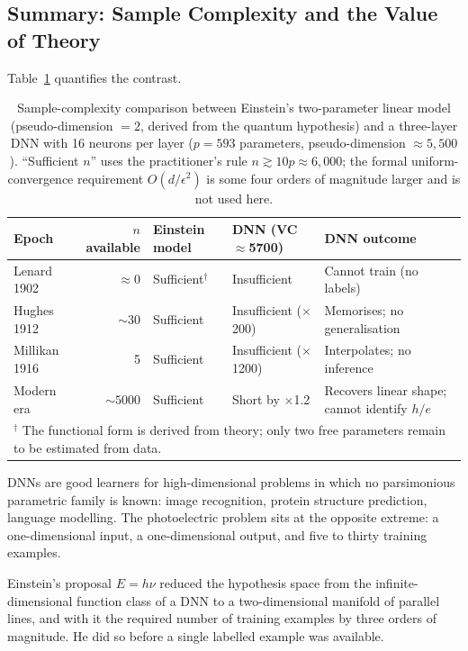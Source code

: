 \documentclass[12pt]{article}
\begin{document}
\subsection{Summary: Sample Complexity and the Value of Theory}

Table~\ref{tab:sample_complexity} quantifies the contrast.

\begin{table}[ht]
\centering
\caption{Sample-complexity comparison between Einstein's two-parameter
linear model (pseudo-dimension $=2$, derived from the quantum hypothesis) and
a three-layer DNN with 16 neurons per layer ($p=593$ parameters,
pseudo-dimension $\approx 5{,}500$).  ``Sufficient $n$'' uses the
practitioner's rule $n\gtrsim10p \approx 6{,}000$; the formal
uniform-convergence requirement $O(d/\epsilon^2)$ is some four orders of
magnitude larger and is not used here.}
\label{tab:sample_complexity}
\begin{tabular}{p{2.8cm}rp{2.4cm}p{2.4cm}p{4.0cm}}
\toprule
Epoch & $n$ available & Einstein model & DNN (VC$\approx$5700) & DNN outcome \\
\midrule
Lenard 1902   & $\approx 0$  & Sufficient$^\dagger$ & Insufficient
  & Cannot train (no labels) \\
Hughes 1912   & $\sim 30$    & Sufficient
  & Insufficient ($\times$200) & Memorises; no generalisation \\
Millikan 1916 & 5            & Sufficient
  & Insufficient ($\times$1200) & Interpolates; no inference \\
Modern era    & $\sim 5000$  & Sufficient
  & Short by $\times$1.2 & Recovers linear shape;
  cannot identify $h/e$ \\
\bottomrule
\multicolumn{5}{p{14cm}}{$^\dagger$ The functional form is derived from
  theory; only two free parameters remain to be estimated from data.}
\end{tabular}
\end{table}

DNNs are good learners for high-dimensional problems in which no
parsimonious parametric family is known: image recognition, protein
structure prediction, language modelling.  The photoelectric problem sits at
the opposite extreme: a one-dimensional input, a one-dimensional output, and
five to thirty training examples.

Einstein's proposal $E=h\nu$ reduced the hypothesis space from the
infinite-dimensional function class of a DNN to a two-dimensional manifold of
parallel lines, and with it the required number of training examples by three
orders of magnitude.  He did so before a single labelled example was
available.
\end{document}
